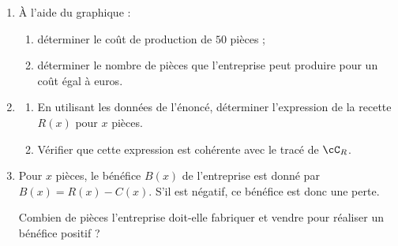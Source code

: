 \begin{enumerate}
\item À l'aide du graphique :
\begin{enumerate}
\item déterminer le coût de production de $50$ pièces ;
\item déterminer le nombre de pièces que l'entreprise peut produire pour un coût égal à  euros.
\end{enumerate}
\item
\begin{enumerate}
\item En utilisant les données de l'énoncé, déterminer l'expression de la recette $R(x)$ pour $x$ pièces.
\item Vérifier que cette expression est cohérente avec le tracé de $\cC_R$.
\end{enumerate}
\item Pour $x$ pièces, le bénéfice $B(x)$ de l'entreprise est donné par $B(x)=R(x)-C(x)$. S'il est négatif, ce \og bénéfice \fg{} est donc une perte.

Combien de pièces l'entreprise doit-elle fabriquer et vendre pour réaliser un bénéfice positif ?
\end{enumerate}


